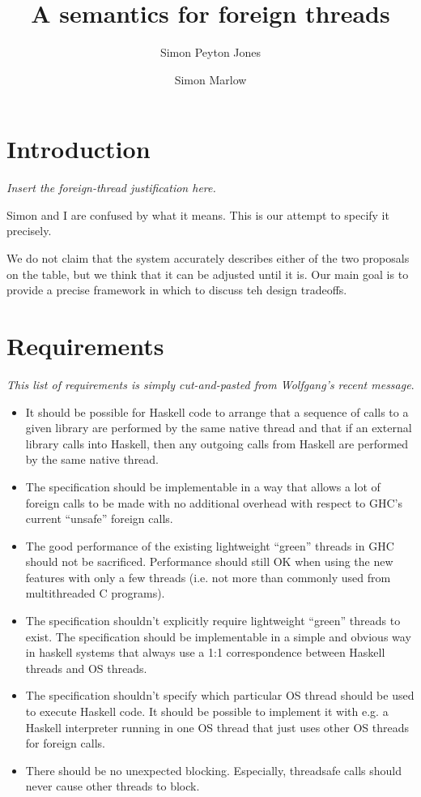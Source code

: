 \documentclass{article}
\begin{document}
\title{A semantics for foreign threads}

\author{Simon Peyton Jones \and Simon Marlow}


\makeatactive

\section{Introduction}

\emph{Insert the foreign-thread justification here.}

Simon and I are confused by what it means. This is our attempt to specify it precisely.

We do not claim that the system accurately describes either of the two proposals on
the table, but we think that it can be adjusted until it is.  Our main goal is to
provide a precise framework in which to discuss teh design tradeoffs.

\section{Requirements}

\emph{This list of requirements is simply cut-and-pasted from Wolfgang's recent
message}.

\begin{itemize}
\item It should be possible for Haskell code to arrange that a sequence of
calls to a given library are performed by the same native thread and
that if an external library calls into Haskell, then any outgoing calls
from Haskell are performed by the same native thread.

\item The specification should be implementable in a way that allows a lot
of foreign calls to be made with no additional overhead with respect to
GHC's current ``unsafe'' foreign calls.

\item The good performance of the existing lightweight ``green'' threads in
GHC should not be sacrificed. Performance should still OK when using
the new features with only a few threads (i.e. not more than commonly
used from multithreaded C programs).

\item The specification shouldn't explicitly require lightweight ``green''
threads to exist. The specification should be implementable in a simple
and obvious way in haskell systems that always use a 1:1 correspondence
between Haskell threads and OS threads.

\item The specification shouldn't specify which particular OS thread
should be used to execute Haskell code. It should be possible to
implement it with e.g. a Haskell interpreter running in one OS thread
that just uses other OS threads for foreign calls.

\item There should be no unexpected blocking. Especially, threadsafe calls
should never cause other threads to block.
\end{itemize}
\end{document}
